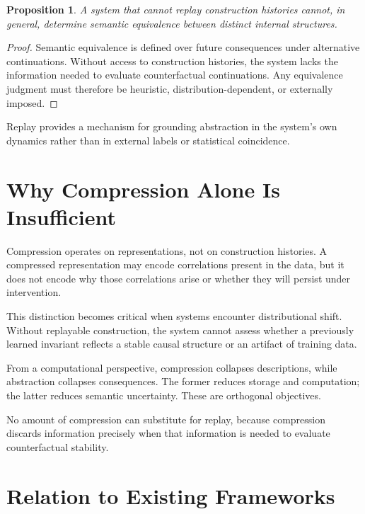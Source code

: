 \documentclass[11pt]{article}
\newtheorem{proposition}{Proposition}[section]
\begin{document}
\begin{proposition}
A system that cannot replay construction histories cannot, in general, determine semantic equivalence between distinct internal structures.
\end{proposition}

\begin{proof}
Semantic equivalence is defined over future consequences under alternative continuations. Without access to construction histories, the system lacks the information needed to evaluate counterfactual continuations. Any equivalence judgment must therefore be heuristic, distribution-dependent, or externally imposed.
\end{proof}

Replay provides a mechanism for grounding abstraction in the system's own dynamics rather than in external labels or statistical coincidence.

\section{Why Compression Alone Is Insufficient}

Compression operates on representations, not on construction histories. A compressed representation may encode correlations present in the data, but it does not encode why those correlations arise or whether they will persist under intervention.

This distinction becomes critical when systems encounter distributional shift. Without replayable construction, the system cannot assess whether a previously learned invariant reflects a stable causal structure or an artifact of training data.

From a computational perspective, compression collapses descriptions, while abstraction collapses consequences. The former reduces storage and computation; the latter reduces semantic uncertainty. These are orthogonal objectives.

No amount of compression can substitute for replay, because compression discards information precisely when that information is needed to evaluate counterfactual stability.

\section{Relation to Existing Frameworks}
\end{document}
